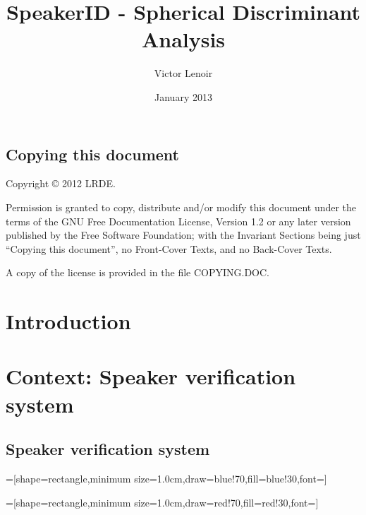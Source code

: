 \documentclass{techrep} %
\title{SpeakerID - Spherical Discriminant Analysis}
\author{Victor Lenoir} \revision$LastChangedRevision: 2340 $
\date{January 2013} \email{lenoir@lrde.epita.fr}
\begin{document}
\section*{Copying this document}
Copyright \copyright{} 2012 LRDE.

Permission is granted to copy, distribute and/or modify this document under
the terms of the GNU Free Documentation License, Version 1.2 or any later
version published by the Free Software Foundation; with the Invariant Sections
being just ``Copying this document'', no Front-Cover Texts, and no Back-Cover
Texts.

A copy of the license is provided in the file COPYING.DOC.

\tableofcontents

\newpage
\chapter*{Introduction}
\chapter{Context: Speaker verification system}


\section{Speaker verification system}

=[shape=rectangle,minimum
  size=1.0cm,draw=blue!70,fill=blue!30,font=\small]

=[shape=rectangle,minimum
  size=1.0cm,draw=red!70,fill=red!30,font=\small]
\end{document}
